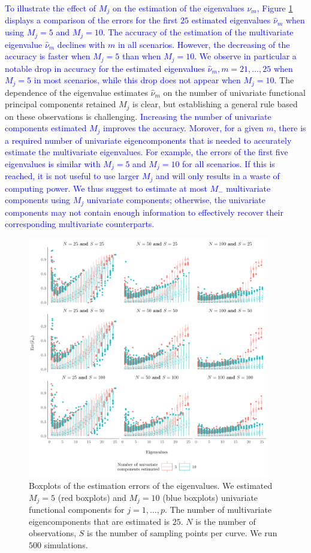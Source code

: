 \textcolor{blue}{To illustrate the effect of $M_j$ on the estimation of the eigenvalues $\nu_m$, Figure \ref{fig:ncomp} displays a comparison of the errors for the first $25$ estimated eigenvalues $\widehat{\nu}_m$ when using $M_j = 5$ and $M_j = 10$. The accuracy of the estimation of the multivariate eigenvalue $\widehat{\nu}_m$ declines with $m$ in all scenarios. However, the decreasing of the accuracy is faster when $M_j = 5$ than when $M_j = 10$. We observe in particular a notable drop in accuracy for the estimated eigenvalues $\widehat{\nu}_m, m = 21, \dots, 25$ when $M_j = 5$ in most scenarios, while this drop does not appear when $M_j = 10$.} The dependence of the eigenvalue estimates $\widehat{\nu}_m$ on the number of univariate functional principal components retained $M_j$ is clear, but establishing a general rule based on these observations is challenging. \textcolor{blue}{Increasing the number of univariate components estimated $M_j$ improves the accuracy. Morover, for a given $m$, there is a required number of univariate eigencomponents that is needed to accurately estimate the multivariate eigenvalues. For example, the errors of the first five eigenvalues is similar with $M_j = 5$ and $M_j = 10$ for all scenarios. If this is reached, it is not useful to use larger $M_j$ and will only results in a waste of computing power. We thus suggest to estimate at most $M_{-}$ multivariate components using $M_j$ univariate components; otherwise, the univariate components may not contain enough information to effectively recover their corresponding multivariate counterparts.}
\begin{figure}
     \centering
    \includegraphics[width=0.94\textwidth]{figures/ncomp.pdf}
    \caption{Boxplots of the estimation errors of the eigenvalues. We estimated $M_j = 5$ (red boxplots) and $M_j = 10$ (blue boxplots) univariate functional components for $j = 1, \dots, p$. The number of multivariate eigencomponents that are estimated is $25$. $N$ is the number of observations, $S$ is the number of sampling points per curve. We run $500$ simulations.}
    \label{fig:ncomp}
\end{figure}

